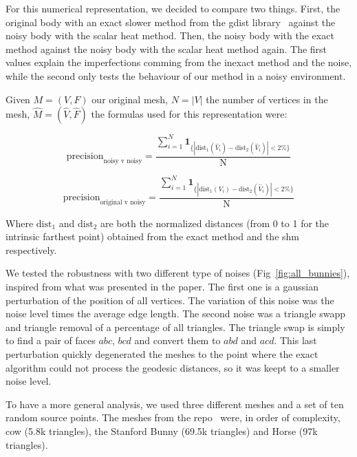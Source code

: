 \documentclass[sigconf]{acmart}
\begin{document}
For this numerical representation, we decided to compare two things. First, the original body
with an exact slower method from the gdist library~\cite{exact_method_algorithm}\cite{exact_method_library}
against the noisy body with the scalar heat method.
Then, the noisy body with the exact method against the noisy body with the scalar heat method again.
The first values explain the imperfections comming from the inexact method and the noise, while
the second only tests the behaviour of our method in a noisy environment.

Given $M = (V, F)$ our original mesh, $N = |V|$ the number of vertices in the mesh, $\hat{M} = (\hat{V}, \hat{F})$ the formulas used for this representation were:

\begin{equation} \label{eq:nvn_precision}
  \text{precision}_{\text{noisy v noisy}} = \frac{\sum_{i=1}^N \mathbf{1}_{\{|\text{dist}_1(\hat{V}_i) - \text{dist}_2(\hat{V}_i)| < 2\%\}}}{\text{N}} 
\end{equation}

\begin{equation} \label{eq:ovn_precision}
  \text{precision}_{\text{original v noisy}} = \frac{\sum_{i=1}^N \mathbf{1}_{\{|\text{dist}_1(V_i) - \text{dist}_2(\hat{V}_i)| < 2\%\}}}{\text{N}} 
\end{equation}

Where $\text{dist}_1$ and $\text{dist}_2$ are both the normalized distances (from 0 to 1 for the intrinsic farthest point) obtained from the exact method and the shm respectively.

We tested the robustness with two different type of noises (Fig~\ref{fig:all_bunnies}), inspired from what was presented in the paper. 
The first one is a gaussian perturbation of the position of all vertices. The variation of this noise was the noise level times the average edge length.
The second noise was a triangle swapp and triangle removal of a percentage of all triangles.
The triangle swap is simply to find a pair of faces $abc$, $bcd$ and convert them to $abd$ and $acd$.
This last perturbation quickly degenerated the meshes to the point where the exact algorithm could not
process the geodesic distances, so it was keept to a smaller noise level. 

To have a more general analysis, we used three different meshes and a set of ten random
source points. The meshes from the repo~\cite{github_objects_repo} were, in order of complexity, cow (5.8k triangles), the Stanford Bunny (69.5k triangles) and Horse (97k triangles).
\end{document}
